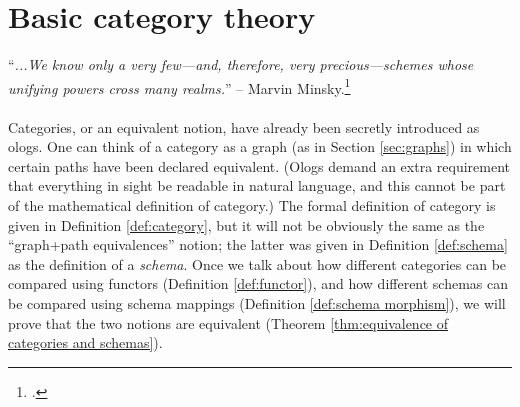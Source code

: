 
\chapter{Basic category theory}\label{chap:categories}

“{\it ...We know only a very few—and, therefore, very precious—schemes whose unifying powers cross many realms.}” -- Marvin Minsky.\footnote{\cite[Problems of disunity, p. 126]{Min}.}\\\\


Categories, or an equivalent notion, have already been secretly introduced as ologs. One can think of a category as a graph (as in Section \ref{sec:graphs}) in which certain paths have been declared equivalent. (Ologs demand an extra requirement that everything in sight be readable in natural language, and this cannot be part of the mathematical definition of category.) The formal definition of category is given in Definition \ref{def:category}, but it will not be obviously the same as the “graph+path equivalences” notion; the latter was given in Definition \ref{def:schema} as the definition of a {\em schema}. Once we talk about how different categories can be compared using functors (Definition \ref{def:functor}), and how different schemas can be compared using schema mappings (Definition \ref{def:schema morphism}), we will prove that the two notions are equivalent (Theorem \ref{thm:equivalence of categories and schemas}).

